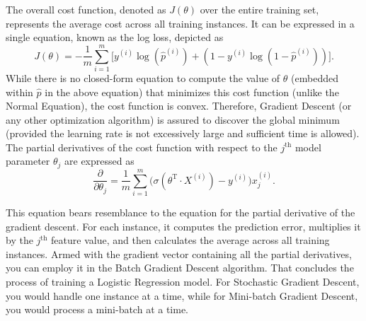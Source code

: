 \documentclass[12pt,letter]{article}
\begin{document}
The overall cost function, denoted as $J(\theta)$ over the entire training set, represents the average cost across all training instances. It can be expressed in a single equation, known as the log loss, depicted as
\begin{equation}
J(\theta) = -\frac{1}{m}\sum_{i=1}^{m}\big[y^{(i)} \log (\hat{p}^{(i)}) + (1 - y^{(i)} \log (1-\hat{p}^{(i)})) \big].
\label{eq:log_loss}
\end{equation}
While there is no closed-form equation to compute the value of $\theta$ (embedded within $\hat{p}$ in the above equation) that minimizes this cost function (unlike the Normal Equation), the cost function is convex. Therefore, Gradient Descent (or any other optimization algorithm) is assured to discover the global minimum (provided the learning rate is not excessively large and sufficient time is allowed). The partial derivatives of the cost function with respect to the $j^\text{th}$ model parameter $\theta_j$ are expressed as
\begin{equation}
 \frac{\partial}{\partial \theta_j} = \frac{1}{m} \sum_{i=1}^{m} \big(\sigma ( \theta^\text{T} \cdot X^{(i)}) - y^{(i)} \big) x_j^{(i)}.
\label{eq:Logistic_cost_function_partial_derivatives}
\end{equation}

This equation bears resemblance to the equation for the partial derivative of the gradient descent. For each instance, it computes the prediction error, multiplies it by the $j^\text{th}$ feature value, and then calculates the average across all training instances. Armed with the gradient vector containing all the partial derivatives, you can employ it in the Batch Gradient Descent algorithm. That concludes the process of training a Logistic Regression model. For Stochastic Gradient Descent, you would handle one instance at a time, while for Mini-batch Gradient Descent, you would process a mini-batch at a time.
\end{document}
